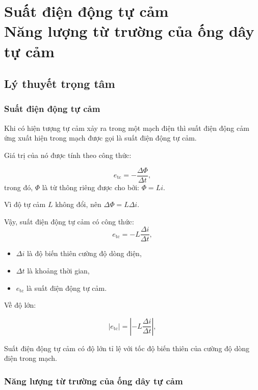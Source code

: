 \chapter[Suất điện động tự cảm - Năng lượng từ trường của ống dây tự cảm]{Suất điện động tự cảm \\ Năng lượng từ trường của ống dây tự cảm}
\section{Lý thuyết trọng tâm}
\subsection{Suất điện động tự cảm}
Khi có hiện tượng tự cảm xảy ra trong một mạch điện thì suất điện động cảm ứng xuất hiện trong mạch được gọi là suất điện động tự cảm.

Giá trị của nó được tính theo công thức:

\begin{equation}
e_\text{tc}=-\dfrac{\Delta \Phi}{\Delta t},
\end{equation}
trong đó, $\Phi$ là từ thông riêng được cho bởi: $\Phi=Li$.

Vì độ tự cảm $L$ không đổi, nên $\Delta \Phi=L\Delta i$.

Vậy, suất điện động tự cảm có công thức:
\begin{equation}
e_\text{tc}=-L\dfrac{ \Delta i}{\Delta t},
\end{equation}
\begin{itemize}
	\item $\Delta i$ là độ biến thiên cường độ dòng điện,
	\item $\Delta t$ là khoảng thời gian, 
	\item $e_\text{tc}$ là suất điện động tự cảm. 
\end{itemize}

Về độ lớn:

\begin{equation}
\left| e_\text{tc}\right| =\left| -L\dfrac{ \Delta i}{\Delta t}\right| ,
\end{equation}

Suất điện động tự cảm có độ lớn tỉ lệ với tốc độ biến thiên của cường độ dòng  điện trong mạch.

\subsection{Năng lượng từ trường của ống dây tự cảm}

